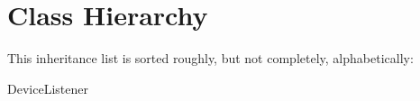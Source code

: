 \section{Class Hierarchy}
This inheritance list is sorted roughly, but not completely, alphabetically\+:\begin{DoxyCompactList}
\item {}
\item Device\+Listener\begin{DoxyCompactList}
\item {}
\end{DoxyCompactList}
\item {}
\end{DoxyCompactList}
